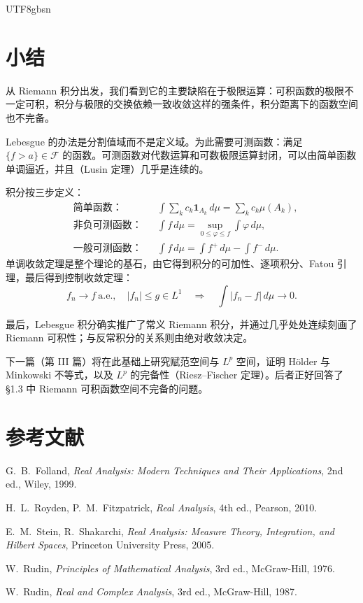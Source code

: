 \documentclass[11pt]{article}
\begin{document}
\begin{CJK*}{UTF8}{gbsn}
\section*{小结}

从 Riemann 积分出发，我们看到它的主要缺陷在于极限运算：可积函数的极限不一定可积，积分与极限的交换依赖一致收敛这样的强条件，积分距离下的函数空间也不完备。

Lebesgue 的办法是分割值域而不是定义域。为此需要可测函数：满足 $\{f>a\}\in\mathcal{F}$ 的函数。可测函数对代数运算和可数极限运算封闭，可以由简单函数单调逼近，并且（Lusin 定理）几乎是连续的。

积分按三步定义：
\begin{align*}
&\text{简单函数：}&&\int\sum_{k}c_{k}\mathbf{1}_{A_{k}}\,d\mu=\sum_{k}c_{k}\mu(A_{k}),\\
&\text{非负可测函数：}&&\int f\,d\mu=\sup_{0\leq\varphi\leq f}\int\varphi\,d\mu,\\
&\text{一般可测函数：}&&\int f\,d\mu=\int f^{+}\,d\mu-\int f^{-}\,d\mu.
\end{align*}
单调收敛定理是整个理论的基石，由它得到积分的可加性、逐项积分、Fatou 引理，最后得到控制收敛定理：
\[
f_{n}\to f\ \text{a.e.},\quad|f_{n}|\leq g\in L^{1}\quad\Longrightarrow\quad\int|f_{n}-f|\,d\mu\to0.
\]

最后，Lebesgue 积分确实推广了常义 Riemann 积分，并通过几乎处处连续刻画了 Riemann 可积性；与反常积分的关系则由绝对收敛决定。

下一篇（第 III 篇）将在此基础上研究赋范空间与 $L^{p}$ 空间，证明 Hölder 与 Minkowski 不等式，以及 $L^{p}$ 的完备性（Riesz--Fischer 定理）。后者正好回答了 \S1.3 中 Riemann 可积函数空间不完备的问题。

\section*{参考文献}

\begin{enumerate}[label={[\arabic*]}]
  \item G.~B.~Folland, \textit{Real Analysis: Modern Techniques and Their Applications}, 2nd ed., Wiley, 1999.
  \item H.~L.~Royden, P.~M.~Fitzpatrick, \textit{Real Analysis}, 4th ed., Pearson, 2010.
  \item E.~M.~Stein, R.~Shakarchi, \textit{Real Analysis: Measure Theory, Integration, and Hilbert Spaces}, Princeton University Press, 2005.
  \item W.~Rudin, \textit{Principles of Mathematical Analysis}, 3rd ed., McGraw-Hill, 1976.
  \item W.~Rudin, \textit{Real and Complex Analysis}, 3rd ed., McGraw-Hill, 1987.
\end{enumerate}

\end{CJK*}
\end{document}
